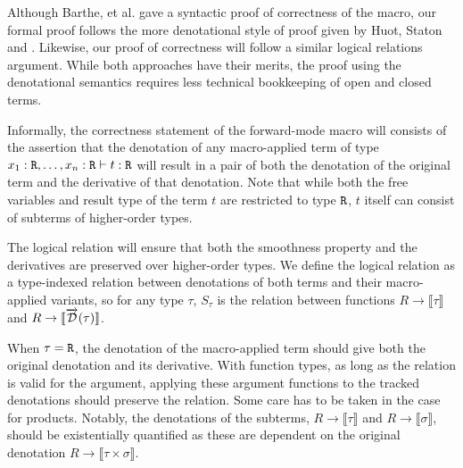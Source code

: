   Although Barthe, et al.\cite{barthe2020versatility} gave a syntactic proof of correctness of the macro, our formal proof follows the more denotational style of proof given by Huot, Staton and \Vakar{}\cite{huot2020correctness}.
  Likewise, our proof of correctness will follow a similar logical relations argument.
  While both approaches have their merits, the proof using the denotational semantics requires less technical bookkeeping of open and closed terms.

  Informally, the correctness statement of the forward-mode macro will consists of the assertion that the denotation of any macro-applied term of type $x_1 : \texttt{R}, \dots, x_n : \texttt{R} \vdash t : \texttt{R}$ will result in a pair of both the denotation of the original term and the derivative of that denotation.
  Note that while both the free variables and result type of the term $t$ are restricted to type $\texttt{R}$, $t$ itself can consist of subterms of higher-order types.

  The logical relation will ensure that both the smoothness property and the derivatives are preserved over higher-order types.
  We define the logical relation as a type-indexed relation between denotations of both terms and their macro-applied variants, so for any type $\tau$, $S_\tau$ is the relation between functions $R \rightarrow \llbracket \tau \rrbracket$ and $R \rightarrow \llbracket \overrightarrow{\mathcal{D}}(\tau) \rrbracket$.

  When $\tau = \texttt{R}$, the denotation of the macro-applied term should give both the original denotation and its derivative.
  With function types, as long as the relation is valid for the argument, applying these argument functions to the tracked denotations should preserve the relation.
  Some care has to be taken in the case for products.
  Notably, the denotations of the subterms, $R \rightarrow \llbracket \tau \rrbracket$ and $R \rightarrow \llbracket \sigma \rrbracket$, should be existentially quantified as these are dependent on the original denotation $R \rightarrow \llbracket \tau \times \sigma \rrbracket$.


